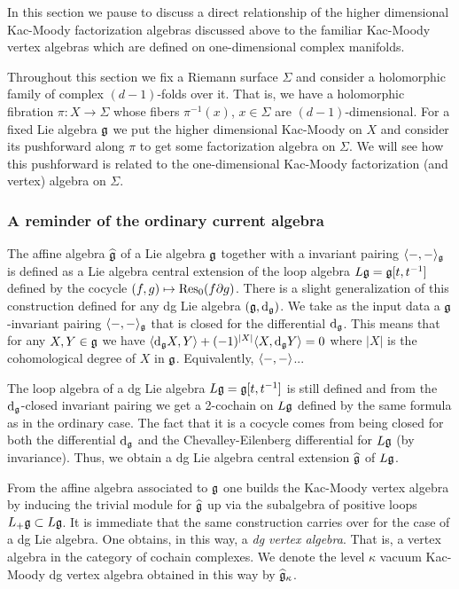 In this section we pause to discuss a direct relationship of the higher dimensional Kac-Moody factorization algebras discussed above to the familiar Kac-Moody vertex algebras which are defined on one-dimensional complex manifolds. 

Throughout this section we fix a Riemann surface $\Sigma$ and consider a holomorphic family of complex $(d-1)$-folds over it. That is, we have a holomorphic fibration $\pi : X \to \Sigma$ whose fibers $\pi^{-1}(x)$, $x \in \Sigma$ are $(d-1)$-dimensional. For a fixed Lie algebra $\mathfrak g$ we put the higher dimensional Kac-Moody on $X$ and consider its pushforward along $\pi$ to get some factorization algebra on $\Sigma$. We will see how this pushforward is related to the one-dimensional Kac-Moody factorization (and vertex) algebra on $\Sigma$.  

\subsubsection{A reminder of the ordinary current algebra}

The affine algebra $\widehat{\mathfrak g}$ of a Lie algebra $\mathfrak g$ together with a invariant pairing $\langle-,-\rangle_\mathfrak g$ is defined as a Lie algebra central extension of the loop algebra $L \mathfrak g = \mathfrak g[t,t^{-1}]$ defined by the cocycle $(f,g) \mapsto {\rm Res_{0}} (f \partial g)$. There is a slight generalization of this construction defined for any dg Lie algebra $(\mathfrak g, {\rm d}_\mathfrak g)$. We take as the input data a $\mathfrak g$-invariant pairing $\langle-,-\rangle_\mathfrak g$ that is closed for the differential ${\rm d}_{\mathfrak g}$. This means that for any $X,Y \in \mathfrak g$ we have $\langle{\rm d}_\mathfrak g X, Y\rangle + (-1)^{|X|} \langle X, {\rm d}_\mathfrak g Y\rangle = 0$ where $|X|$ is the cohomological degree of $X$ in $\mathfrak g$. Equivalently, $\langle-,-\rangle$...

The loop algebra of a dg Lie algebra $L \mathfrak g = \mathfrak g [t,t^{-1}]$ is still defined and from the ${\rm d}_\mathfrak g$-closed invariant pairing we get a 2-cochain on $L \mathfrak g$ defined by the same formula as in the ordinary case. The fact that it is a cocycle comes from being closed for both the differential ${\rm d}_\mathfrak g$ and the Chevalley-Eilenberg differential for $L \mathfrak g$ (by invariance). Thus, we obtain a dg Lie algebra central extension $\widehat{\mathfrak g}$ of $L \mathfrak g$. 

From the affine algebra associated to $\mathfrak g$ one builds the Kac-Moody vertex algebra by inducing the trivial module for $\widehat{\mathfrak g}$ up via the subalgebra of positive loops $L_+ \mathfrak g \subset L \mathfrak g$. It is immediate that the same construction carries over for the case of a dg Lie algebra. One obtains, in this way, a {\em dg vertex algebra}. That is, a vertex algebra in the category of cochain complexes. We denote the level $\kappa$ vacuum Kac-Moody dg vertex algebra obtained in this way by $\widehat{\mathfrak g}_{\kappa}$. 

